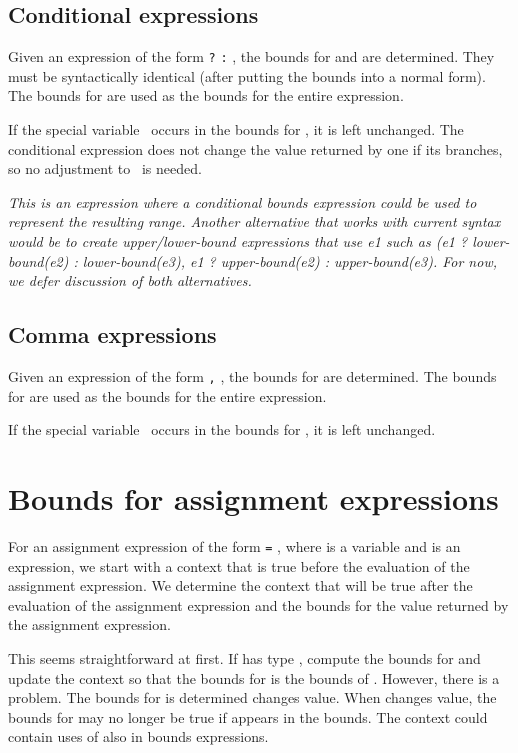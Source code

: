 \subsection{Conditional expressions}

Given an expression of the form  \texttt{?} 
\texttt{:} , the bounds for  and  are
determined. They must be syntactically identical (after putting the
bounds into a normal form). The bounds for  are used as the
bounds for the entire expression.

If the special variable \exprcurrentvalue\ occurs in the
bounds for , it is left unchanged. The conditional expression
does not change the value returned by one if its branches, so no
adjustment to \exprcurrentvalue\ is needed.

\emph{This is an expression where a conditional bounds expression could
be used to represent the resulting range.  Another alternative that works
with current syntax would be to create upper/lower-bound expressions
that use e1 such as (e1 ? lower-bound(e2) : lower-bound(e3), e1 ?
upper-bound(e2) : upper-bound(e3). For now, we defer discussion of both
alternatives. }

\subsection{Comma expressions}

Given an expression of the form  \texttt{,} , the
bounds for  are determined. The bounds for  are used
as the bounds for the entire expression.

If the special variable \exprcurrentvalue\ occurs in the
bounds for , it is left unchanged.

\section{Bounds for assignment expressions}
\label{section:checking-assignment-expressions}

For an assignment expression of the form  \texttt{=} ,
where  is a variable and  is an expression, we start
with a context that is true before the evaluation of the assignment
expression. We determine the context that will be true after the
evaluation of the assignment expression and the bounds for the value
returned by the assignment expression.

This seems straightforward at first. If  has type
\arrayptr, compute the bounds for  and update the
context so that the bounds for  is the bounds of .
However, there is a problem. The bounds for  is determined
  changes value. When  changes value, the bounds
for  may no longer be true if  appears in the bounds.
The context could contain uses of  also in bounds expressions.


